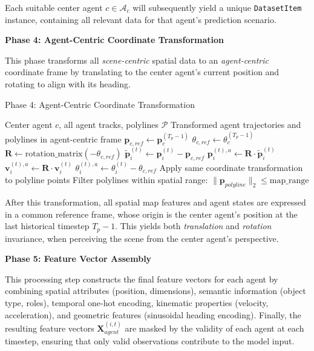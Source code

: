 Each suitable center agent $c \in \mathcal{A}_{c}$ will subsequently yield a unique \texttt{DatasetItem} instance, containing all relevant data for that agent's prediction scenario.

\textbf{Phase 4: Agent-Centric Coordinate Transformation}

This phase transforms all \emph{scene-centric} spatial data to an \emph{agent-centric} coordinate frame by translating to the center agent's current position and rotating to align with its heading.

\begin{algorithm}[H]
\caption{Phase 4: Agent-Centric Coordinate Transformation}
\label{alg:phase4_transform}
\begin{algorithmic}[1]
\REQUIRE Center agent $c$, all agent tracks, polylines $\mathcal{P}$
\ENSURE Transformed agent trajectories and polylines in agent-centric frame
\STATE $\boldsymbol{p}_{c,ref} \leftarrow \boldsymbol{p}_c^{(T_p-1)}$ 
\STATE $\theta_{c,ref} \leftarrow \theta_c^{(T_p-1)}$ 
\STATE $\mathbf{R} \leftarrow \text{rotation\_matrix}(-\theta_{c,ref})$ 
        \STATE $\tilde{\boldsymbol{p}}_i^{(t)} \leftarrow \boldsymbol{p}_i^{(t)} - \boldsymbol{p}_{c,ref}$ 
        \STATE $\boldsymbol{p}_i^{(t),a} \leftarrow \mathbf{R} \cdot \tilde{\boldsymbol{p}}_i^{(t)}$ 
        \STATE $\boldsymbol{v}_i^{(t),a} \leftarrow \mathbf{R} \cdot \boldsymbol{v}_i^{(t)}$ 
        \STATE $\theta_i^{(t),a} \leftarrow \theta_i^{(t)} - \theta_{c,ref}$ 
    \ENDFOR
\ENDFOR
{}
    \STATE Apply same coordinate transformation to polyline points
    \STATE Filter polylines within spatial range: $\|\boldsymbol{p}_{polyline}\|_2 \leq \text{map\_range}$
\ENDFOR
\end{algorithmic}
\end{algorithm}

After this transformation, all spatial map features and agent states are expressed in a common reference frame, whose origin is the center agent's position at the last historical timestep $T_p-1$. This yields both \emph{translation} and \emph{rotation} invariance, when perceiving the scene from the center agent's perspective.

\textbf{Phase 5: Feature Vector Assembly}

This processing step constructs the final feature vectors for each agent by combining spatial attributes (position, dimensions), semantic information (object type, roles), temporal one-hot encoding, kinematic properties (velocity, acceleration), and geometric features (sinusoidal heading encoding). Finally, the resulting feature vectors $\boldsymbol{X}_{agent}^{(i,t)}$ are masked by the validity of each agent at each timestep, ensuring that only valid observations contribute to the model input.

